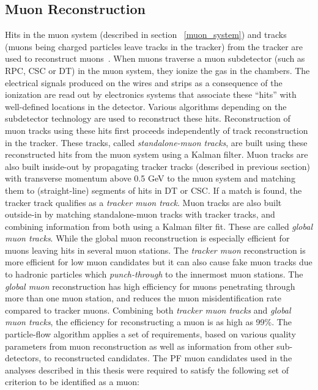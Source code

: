 \subsection{Muon Reconstruction}
\label{mu_recon}
Hits in the muon system (described in section ~\ref{muon_system}) and tracks (muons being charged particles leave tracks in the tracker) from the tracker are used to reconstruct muons~\cite{muon_recon2018}. When muons traverse a muon subdetector (such as RPC, CSC or DT) in the muon system, they ionize the gas in the chambers. The electrical signals produced on the wires and strips as a consequence of the ionization are read out by electronics systems that associate these ``hits'' with well-defined locations in the detector. Various algorithms depending on the subdetector technology are used to reconstruct these hits. Reconstruction of muon tracks using these hits first proceeds independently of track reconstruction in the tracker. These tracks, called \textit{standalone-muon tracks}, are built using these reconstructed hits from the muon system using a Kalman filter. Muon tracks are also built inside-out by propagating tracker tracks (described in previous section) with transverse momentum above 0.5 GeV to the muon system and matching them to (straight-line) segments of hits in DT or CSC. If a match is found, the tracker track qualifies as a \textit{tracker muon track}. Muon tracks are also  built outside-in  by matching standalone-muon tracks with tracker tracks, and combining information from both using a Kalman filter fit. These are called \textit{global muon tracks}. While the global muon reconstruction is especially efficient for muons leaving hits in several muon stations. The \textit{tracker muon} reconstruction is more efficient for low \pt muon candidates but it can also cause fake muon tracks due to hadronic particles which \textit{punch-through} to the innermost muon stations. The \textit{global muon} reconstruction has  high efficiency for muons penetrating through more than one muon station, and reduces the muon misidentification rate compared to tracker muons. Combining both \textit{tracker muon tracks} and \textit{global muon tracks}, the efficiency for reconstructing a muon is as high as 99\%. The particle-flow algorithm applies a set of requirements, based on various quality parameters from muon reconstruction as well as information from other sub-detectors, to  reconstructed candidates. The PF muon candidates used in the analyses described in this thesis were required to satisfy the following set of criterion to be identified as a muon:

